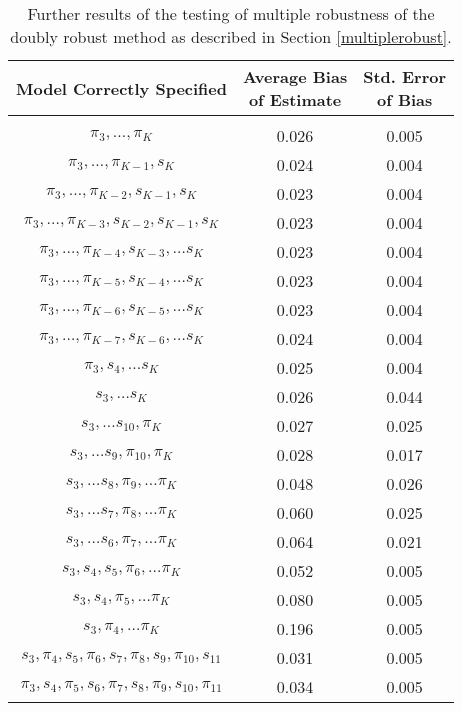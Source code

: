 \begin{table}[h!]
\centering
\begin{tabular} {c | c  c}
Model Correctly Specified & \shortstack{Average Bias \\ of Estimate}  & \shortstack{Std. Error \\of Bias} \\ 
\hline  \\
$\pi_3, \dots, \pi_K$ & 0.026 & 0.005   \\ 
$\pi_3, \dots, \pi_{K-1}, s_K$ & 0.024 & 0.004\\ 
$\pi_3, \dots, \pi_{K-2}, s_{K-1}, s_K$ & 0.023 & 0.004\\ 
$\pi_3, \dots, \pi_{K-3}, s_{K-2} , s_{K-1}, s_K$ & 0.023  &0.004 \\ 
$\pi_3, \dots, \pi_{K-4}, s_{K-3}, \dots s_K $ & 0.023&0.004 \\ 
$\pi_3, \dots, \pi_{K-5}, s_{K-4}, \dots s_K $ &  0.023 &0.004\\ 
$\pi_3, \dots, \pi_{K-6}, s_{K-5}, \dots s_K $ &  0.023 & 0.004 \\ 
$\pi_3, \dots, \pi_{K-7}, s_{K-6}, \dots s_K $ &  0.024 & 0.004\\ 
$\pi_3, s_{4}, \dots s_K $ &  0.025& 0.004 \\ 
$s_3, \dots s_K$ & 0.026 & 0.044 \\ 
$s_3, \dots s_{10}, \pi_K$ & 0.027 & 0.025 \\
$s_3, \dots s_9, \pi_{10}, \pi_K$ &  0.028 & 0.017 \\ 
$s_3, \dots s_8, \pi_9, \dots \pi_K$ & 0.048 &0.026   \\ 
$s_3, \dots s_7, \pi_8, \dots \pi_K$ &  0.060 &  0.025   \\ 
$s_3, \dots s_6, \pi_7, \dots \pi_K$ & 0.064 &0.021 \\ 
$s_3, s_4, s_5, \pi_6, \dots \pi_K$ & 0.052 & 0.005  \\ 
$s_3, s_4, \pi_5, \dots \pi_K$ & 0.080 & 0.005 \\ 
$s_3, \pi_4, \dots \pi_K$ &  0.196 & 0.005 \\ 
$s_3, \pi_4, s_5, \pi_6, s_7, \pi_8, s_9, \pi_{10}, s_{11}$ & 0.031& 0.005 \\ 
$\pi_3, s_4, \pi_5, s_6, \pi_7, s_8, \pi_9, s_{10}, \pi_{11}$ & 0.034 & 0.005
\end{tabular} \\
\centering
\caption{Further results of the testing of multiple robustness of the doubly robust method as described in Section \ref{multiplerobust}.}
\label{MultipleTable}
\end{table}
